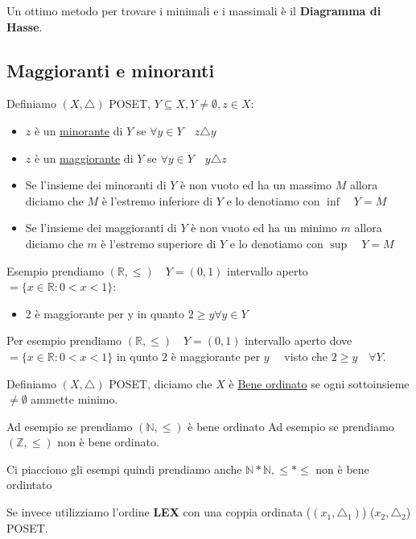 \documentclass{article}
\theoremstyle{definition}
\begin{document}
Un ottimo metodo per trovare i minimali e i massimali è il \textbf{Diagramma di Hasse}. \par



\subsection{Maggioranti e minoranti}
Definiamo $(X, \triangle)$ POSET, $Y \subseteq X, Y \not = \emptyset, z \in X$:

\begin{itemize}
        \item $z$ è un \underline{minorante} di $Y$ se $\forall y \in Y \quad z \triangle y$
        \item $z$ è un \underline{maggiorante} di $Y$ se $\forall y \in Y \quad y \triangle z$

        \item Se l'insieme dei minoranti di $Y$ è non vuoto ed ha un massimo $M$ allora diciamo che $M$ è l'estremo inferiore di $Y$ e lo denotiamo con $\inf \quad  Y = M$
        \item Se l'insieme dei maggioranti di $Y$ è non vuoto ed ha un minimo $m$ allora diciamo che $m$ è l'estremo superiore di $Y$ e lo denotiamo con $\sup \quad  Y = M$
\end{itemize}

Esempio prendiamo $(\mathbb{R}, \le) \quad Y = (0,1)$ intervallo aperto $= \{x \in \mathbb{R} : 0 < x < 1\}$:
\begin{itemize}
        \item 2 è maggiorante per y in quanto $2 \ge y \forall y \in Y$
\end{itemize}

Per esempio prendiamo $(\mathbb{R}, \le) \quad Y = (0,1)$ intervallo aperto dove $ = \{x \in \mathbb{R} : 0 < x < 1\}$ in qunto $2$ è maggiorante per $y \quad $ visto che $2 \ge y \quad  \forall Y$.


Definiamo $(X, \triangle)$ POSET, diciamo che $X$ è \underline{Bene ordinato} se ogni sottoinsieme  $\not = \emptyset$ ammette minimo. \par
Ad esempio se prendiamo $(\mathbb{N}, \le)$ è bene ordinato
Ad esempio se prendiamo $(\mathbb{Z}, \le)$ non è bene ordinato. \par
Ci piacciono gli esempi quindi prendiamo anche $\mathbb{N}*\mathbb{N}, \le * \le  $ non è bene ordintato \par
Se invece utilizziamo l'ordine \textbf{LEX} con una coppia ordinata ($(x_1,\triangle_1)$) ($x_2,\triangle_2$) POSET.\newline
\end{document}
